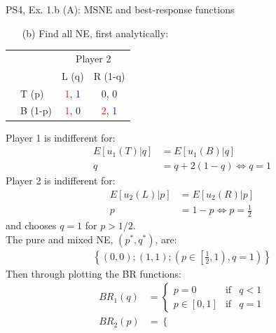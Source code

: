 \begin{frame}{PS4, Ex. 1.b (A): MSNE and best-response functions}
  \begin{multicols}{2}
    \begin{itemize}
      \item[(b)] Find all NE, first analytically:
    \end{itemize}
    \begin{table}
      \begin{tabular}{cl|c|c|}
        & \multicolumn{1}{c}{} & \multicolumn{2}{c}{\color{blue}Player 2}\\
        \parbox[t]{1mm}{}
        &  &  &  \\
        & T (p) & \textcolor{red}{1}, \textcolor{blue}{1} & 0, 0 \\
        & B (1-p) & \textcolor{red}{1}, 0 & \textcolor{red}{2}, \textcolor{blue}{1} \\
      \end{tabular}
    \end{table}
    Player 1 is indifferent for:
    \begin{align*}
      E[u_1(T)|q]&=E[u_1(B)|q]\\
      q &= q + 2(1-q) \Leftrightarrow q = 1
    \end{align*}
    Player 2 is indifferent for:
    \begin{align*}
      E[u_2(L)|p]&=E[u_2(R)|p]\\
      p &= 1-p \Leftrightarrow p = \frac{1}{2}
    \end{align*}
    and chooses $q=1$ for $p>1/2$.\\\medskip
    The pure and mixed NE, $(p^{*},q^{*})$, are:
    \begin{align*}
      \left\{(0,0);(1,1);\left(p\in\left[\frac{1}{2},1\right),q=1\right)\right\}
    \end{align*}
  \vfill\null \columnbreak
    Then through plotting the BR functions:
    \vspace{-8pt}
    \begin{align*}
      BR_1(q)&=\left\{ \begin{array}{lcl}
          p=0       & \text{if} & q<1 \\
          p\in[0,1] & \text{if} & q=1
      \end{array}\right. \\
      BR_2(p)&=\left\{ \begin{array}{lcl}

\end{array}
\end{align*}
\end{multicols}
\end{frame}
